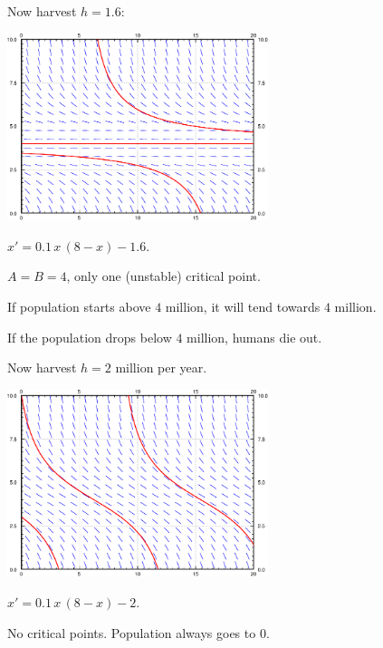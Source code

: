 \documentclass[10pt,aspectratio=169]{beamer}
\begin{document}
\begin{frame}
Now harvest $h=1.6$:

\vspace*{-\baselineskip}

\hspace*{1.5in} \includegraphics[width=3in]{../figures/2-2-logistic-hc}

\hspace*{1.5in} $x' = 0.1\,x\,(8-x)-1.6$.

\medskip
\pause

$A=B=4$, only one (unstable) critical point.

\medskip
\pause

If population starts above $4$ million, it will tend towards $4$ million.

\medskip
\pause

If the population drops below $4$ million, humans die out.

\end{frame}

\begin{frame}
Now harvest $h=2$ million per year.

\medskip
\pause

\qquad \includegraphics[width=3in]{../figures/2-2-logistic-h2}

\qquad $x' = 0.1\,x\,(8-x)-2$.

\medskip
\pause

No critical points.
\pause
Population always goes to 0.

\end{frame}
\end{document}
